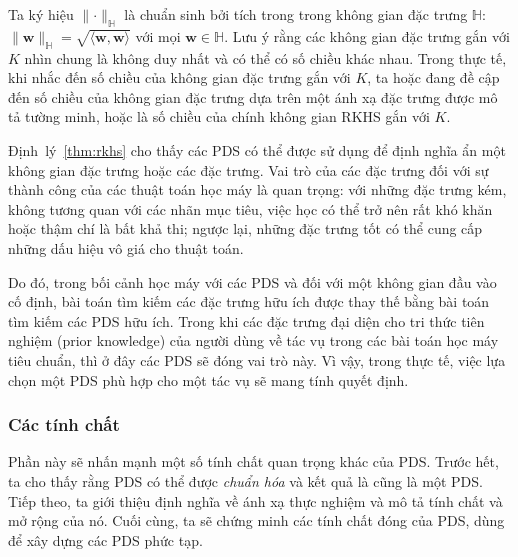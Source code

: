 Ta ký hiệu $\lVert \cdot \rVert_{\mathbb{H}}$ là chuẩn sinh bởi tích trong
trong không gian đặc trưng $\mathbb{H}$: $\lVert\mathbf{w}\rVert_{\mathbb{H}} =
\sqrt{\langle \mathbf{w}, \mathbf{w} \rangle}$ với mọi $\mathbf{w} \in
\mathbb{H}$. Lưu ý rằng các không gian đặc trưng gắn với $K$ nhìn chung là
không duy nhất và có thể có số chiều khác nhau.  Trong thực tế, khi nhắc đến số
chiều của không gian đặc trưng gắn với $K$, ta hoặc đang đề cập đến số chiều
của không gian đặc trưng dựa trên một ánh xạ đặc trưng được mô tả tường minh,
hoặc là số chiều của chính không gian RKHS gắn với $K$.

Định~lý~\ref{thm:rkhs} cho thấy các  PDS có thể được sử dụng để
định nghĩa ẩn một không gian đặc trưng hoặc các  đặc trưng. Vai trò
của các đặc trưng đối với sự thành công của các thuật toán học máy là quan
trọng: với những đặc trưng kém, không tương quan với các nhãn mục tiêu, việc
học có thể trở nên rất khó khăn hoặc thậm chí là bất khả thi; ngược lại, những
đặc trưng tốt có thể cung cấp những dấu hiệu vô giá cho thuật toán.

Do đó, trong bối cảnh học máy với các  PDS và đối với một không gian
đầu vào cố định, bài toán tìm kiếm các đặc trưng hữu ích được thay thế bằng bài
toán tìm kiếm các  PDS hữu ích. Trong khi các đặc trưng đại diện cho
tri thức tiên nghiệm (prior knowledge) của người dùng về tác vụ trong các bài
toán học máy tiêu chuẩn, thì ở đây các  PDS sẽ đóng vai trò này. Vì
vậy, trong thực tế, việc lựa chọn một  PDS phù hợp cho một tác vụ sẽ
mang tính quyết định.

\subsubsection{Các tính chất}

Phần này sẽ nhấn mạnh một số tính chất quan trọng khác của  PDS.
Trước hết, ta cho thấy rằng  PDS có thể được \emph{chuẩn hóa} và kết
quả là cũng là một  PDS. Tiếp theo, ta giới thiệu định nghĩa về ánh
xạ  thực nghiệm và mô tả tính chất và mở rộng của nó. Cuối cùng, ta
sẽ chứng minh các tính chất đóng của  PDS, dùng để xây dựng các
 PDS phức tạp.

